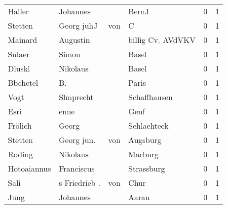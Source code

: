 \begin{center}
\begin{tiny}
\begin{longtabu}{llllrr}
                   Haller &                           Johannes &             &                                       BernJ &          0 &         1 \\
                  Stetten &                        Georg  juhJ &         von &                                           C &          0 &         1 \\
                  Mainard &                           Augustin &             &                           billig Cv. AVdVKV &          0 &         1 \\
                   Sulaer &                              Simon &             &                                       Basel &          0 &         1 \\
                   Dluskl &                           Nikolaus &             &                                       Basel &          0 &         1 \\
                 Bbchetel &                                 B. &             &                                       Paris &          0 &         1 \\
                     Vogt &                          Slmprecht &             &                                Schaffhausen &          0 &         1 \\
                     Esri &                               enne &             &                                        Genf &          0 &         1 \\
                  Frölich &                              Georg &             &                                 Sehlaehteck &          0 &         1 \\
                  Stetten &                        Georg  jun. &         von &                                    Augsburg &          0 &         1 \\
                   Roding &                           Nikolaus &             &                                     Marburg &          0 &         1 \\
              Hotoaiannus &                         Franciscus &             &                                  Strassburg &          0 &         1 \\
                     Sali &                      s Friedrieb . &         von &                                        Chur &          0 &         1 \\
                     Jung &                           Johannes &             &                                       Aarau &          0 &         1 \\

\end{longtabu}
\end{tiny}
\end{center}
